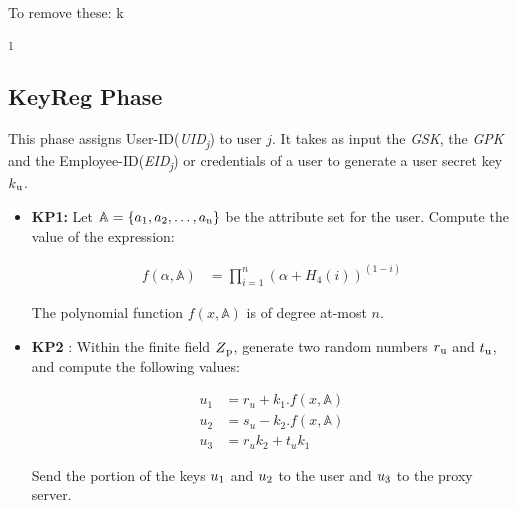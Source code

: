 \documentclass[conference]{IEEEtran}
\begin{document}
{\color{red} {To remove these:}}
k{\textsubscript{1}





\subsection{\textbf {KeyReg Phase}}
This phase assigns User-ID(\emph{UID\textsubscript{j}}) to user $j$. It takes as input the \emph{GSK}, the \emph{GPK} and the Employee-ID(\emph{EID\textsubscript{j}}) or credentials of a user to generate a user secret key $k\textsubscript{u}$.
\begin{itemize}
\item{\textbf{KP1:}} Let $\mathbb{A}  = \{a\textsubscript{1}, a\textsubscript{2}, \ldots, a\textsubscript{n}\}$ be the attribute set for the user. Compute the value of the expression:

\begin{ceqn}
    \begin{align}
    f(\alpha , \mathbb{A} ) &= \prod_{i=1}^{n}(\alpha + H_4(i))^{(1-i)} 
    \end{align}
\end{ceqn}
    
The polynomial function $f(x, \mathbb{A} )$ is of degree at-most $n$.

\item{\textbf {KP2}} : Within the finite field $Z\textsubscript{p}$, generate two random numbers $r\textsubscript{u}$ and $t\textsubscript{u}$, and compute the following values: 
\begin{ceqn}
    \begin{align}
        u_1 &= r_u+k_1.f(x, \mathbb{A} )\\
        u_2 &= s_u - k_2.f(x, \mathbb{A} )\\
        u_3 &= r_u k_2 + t_u  k_1
    \end{align}
\end{ceqn}
    
Send the portion of the keys $u\textsubscript{1}$ and $u\textsubscript{2}$ to the user and $u\textsubscript{3}$ to the proxy server.


\end{itemize}}
\end{document}
